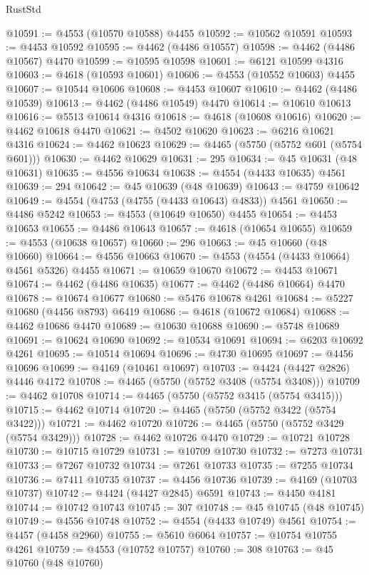 \begin{lexlean}{RustStd}
\begin{coremodule}
@10591 := @4553 (@10570 @10588) @4455
@10592 := @10562 @10591
@10593 := @4453 @10592
@10595 := @4462 (@4486 @10557)
@10598 := @4462 (@4486 @10567) @4470
@10599 := @10595 @10598
@10601 := @6121 @10599 @4316
@10603 := @4618 (@10593 @10601)
@10606 := @4553 (@10552 @10603) @4455
@10607 := @10544 @10606
@10608 := @4453 @10607
@10610 := @4462 (@4486 @10539)
@10613 := @4462 (@4486 @10549) @4470
@10614 := @10610 @10613
@10616 := @5513 @10614 @4316
@10618 := @4618 (@10608 @10616)
@10620 := @4462 @10618 @4470
@10621 := @4502 @10620
@10623 := @6216 @10621 @4316
@10624 := @4462 @10623
@10629 := @4465 (@5750 (@5752 @601 (@5754 @601)))
@10630 := @4462 @10629
@10631 := 295
@10634 := @45 @10631 (@48 @10631)
@10635 := @4556 @10634
@10638 := @4554 (@4433 @10635) @4561
@10639 := 294
@10642 := @45 @10639 (@48 @10639)
@10643 := @4759 @10642
@10649 := @4554 (@4753 (@4755 (@4433 @10643) @4833)) @4561
@10650 := @4486 @5242
@10653 := @4553 (@10649 @10650) @4455
@10654 := @4453 @10653
@10655 := @4486 @10643
@10657 := @4618 (@10654 @10655)
@10659 := @4553 (@10638 @10657)
@10660 := 296
@10663 := @45 @10660 (@48 @10660)
@10664 := @4556 @10663
@10670 := @4553 (@4554 (@4433 @10664) @4561 @5326) @4455
@10671 := @10659 @10670
@10672 := @4453 @10671
@10674 := @4462 (@4486 @10635)
@10677 := @4462 (@4486 @10664) @4470
@10678 := @10674 @10677
@10680 := @5476 @10678 @4261
@10684 := @5227 @10680 (@4456 @8793) @6419
@10686 := @4618 (@10672 @10684)
@10688 := @4462 @10686 @4470
@10689 := @10630 @10688
@10690 := @5748 @10689
@10691 := @10624 @10690
@10692 := @10534 @10691
@10694 := @6203 @10692 @4261
@10695 := @10514 @10694
@10696 := @4730 @10695
@10697 := @4456 @10696
@10699 := @4169 (@10461 @10697)
@10703 := @4424 (@4427 @2826) @4446 @4172
@10708 := @4465 (@5750 (@5752 @3408 (@5754 @3408)))
@10709 := @4462 @10708
@10714 := @4465 (@5750 (@5752 @3415 (@5754 @3415)))
@10715 := @4462 @10714
@10720 := @4465 (@5750 (@5752 @3422 (@5754 @3422)))
@10721 := @4462 @10720
@10726 := @4465 (@5750 (@5752 @3429 (@5754 @3429)))
@10728 := @4462 @10726 @4470
@10729 := @10721 @10728
@10730 := @10715 @10729
@10731 := @10709 @10730
@10732 := @7273 @10731
@10733 := @7267 @10732
@10734 := @7261 @10733
@10735 := @7255 @10734
@10736 := @7411 @10735
@10737 := @4456 @10736
@10739 := @4169 (@10703 @10737)
@10742 := @4424 (@4427 @2845) @6591
@10743 := @4450 @4181
@10744 := @10742 @10743
@10745 := 307
@10748 := @45 @10745 (@48 @10745)
@10749 := @4556 @10748
@10752 := @4554 (@4433 @10749) @4561
@10754 := @4457 (@4458 @2960)
@10755 := @5610 @6064
@10757 := @10754 @10755 @4261
@10759 := @4553 (@10752 @10757)
@10760 := 308
@10763 := @45 @10760 (@48 @10760)

\end{coremodule}
\end{lexlean}

